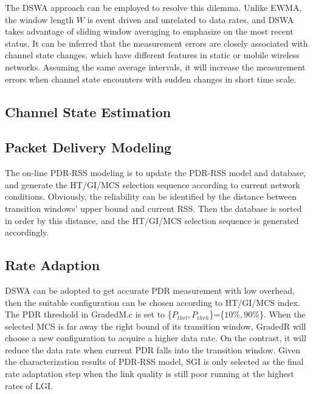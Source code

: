 \documentclass[draftclsnofoot,conference,onecolumn,11pt]{IEEEtran}
\begin{document}
The DSWA approach can be employed to resolve this dilemma. Unlike EWMA, the window length $W$ is event driven and unrelated to data rates, and DSWA takes advantage of sliding window averaging to emphasize on the most recent status. It can be inferred that the measurement errors are closely associated with channel state changes, which have different features in static or mobile wireless networks. Assuming the same average intervals, it will increase the measurement errors when channel state encounters with sudden changes in short time scale.


\subsection{Channel State Estimation} \label{sect:extimation}

\subsection{Packet Delivery Modeling} \label{sect:modeling}

The on-line PDR-RSS modeling is to update the PDR-RSS model and database, and generate the HT/GI/MCS selection sequence according to current network conditions. Obviously, the reliability can be identified by the distance between transition windows' upper bound and current RSS. Then the database is sorted in order by this distance, and the HT/GI/MCS selection sequence is generated accordingly.
 
\subsection{Rate Adaption} \label{sect:adaption}

DSWA can be adopted to get accurate PDR measurement with low overhead, then the suitable configuration can be chosen according to HT/GI/MCS index. The PDR threshold in GradedM.c is set to \{$P_{thrl},P_{thrh}$\}=\{$10\%,90\%$\}. When the selected MCS is far away the right bound of its transition window, GradedR will choose a new configuration to acquire a higher data rate. On the contrast, it will reduce the data rate when current PDR falls into the transition window. Given the characterization results of PDR-RSS model, SGI is only selected as the final rate adaptation step when the link quality is still poor running at the highest rates of LGI.
\end{document}
